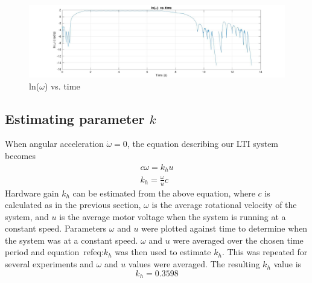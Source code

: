 \documentclass[11pt,titlepage]{article}
\begin{document}
	\begin{figure}[h!]
		\centering
		\includegraphics[trim={6cm 0 0 0},clip,angle=0,origin=c,scale=0.3]{lnw_vs_time}
		\caption{ln($\omega$) vs. time}
		\label{fig:lnw_vs_time}
	\end{figure}
	
	\subsection{Estimating parameter $k$}
	When angular acceleration $\dot{\omega}=0$, the equation describing our LTI system becomes
	\begin{align}
		c\omega=k_hu\nonumber\\
		k_h=\frac{\omega}{u}c\label{eq:k_h}
	\end{align}
	Hardware gain $k_h$ can be estimated from the above equation, where $c$ is calculated as in the previous section, $\omega$ is the average rotational velocity of the system, and $u$ is the average motor voltage when the system is running at a constant speed. Parameters $\omega$ and $u$ were plotted against time to determine when the system was at a constant speed. $\omega$ and $u$ were averaged over the chosen time period and equation~ref{eq:$k_h$} was then used to estimate $k_h$. This was repeated for several experiments and $\omega$ and $u$ values were averaged. The resulting $k_h$ value is
	\begin{equation}
		k_h=0.3598\nonumber
	\end{equation}
	
\end{document}
